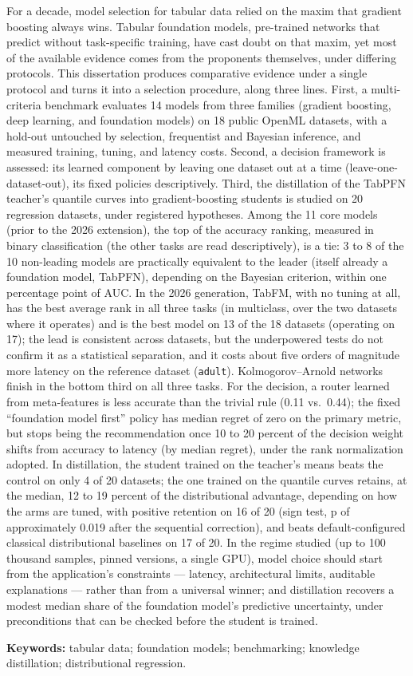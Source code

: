 \enlargethispage{2\baselineskip}%
For a decade, model selection for tabular data relied on the maxim that
gradient boosting always wins. Tabular foundation models, pre-trained
networks that predict without task-specific training, have cast doubt on
that maxim, yet most of the available evidence comes from the
proponents themselves, under differing protocols. This dissertation
produces comparative evidence under a single protocol and turns it
into a selection procedure, along three lines. First, a multi-criteria
benchmark evaluates 14 models from three families (gradient boosting,
deep learning, and foundation models) on 18 public OpenML datasets,
with a hold-out untouched by selection, frequentist and
Bayesian inference, and measured training, tuning, and latency
costs.
Second, a decision framework is assessed: its learned component by
leaving one dataset out at a
time (leave-one-dataset-out), its fixed policies descriptively. Third, the distillation of the TabPFN
teacher's quantile curves into gradient-boosting students is studied on
20 regression datasets, under registered hypotheses. Among the 11
core models (prior to the 2026 extension), the top of the accuracy ranking, measured in binary classification
(the other tasks are read descriptively), is a tie: 3 to 8 of the
10 non-leading models are practically equivalent to the leader (itself
already a foundation model, TabPFN),
depending on the Bayesian criterion, within one percentage point
of AUC. In the 2026 generation, TabFM, with no tuning at all, has the
best average rank in all three tasks (in multiclass, over the two
datasets where it operates) and is the best model on 13 of the
18 datasets (operating on 17); the lead is consistent across
datasets, but the
underpowered tests do not confirm it as a
statistical separation, and it costs about five orders of
magnitude more latency
on the reference dataset (\texttt{adult}). Kolmogorov--Arnold networks finish in the bottom
third on all three tasks. For the decision, a router learned from
meta-features is less accurate than the trivial rule (0.11 vs.\ 0.44);
the fixed ``foundation model first'' policy has median regret of zero on
the primary metric, but stops being the recommendation once 10 to 20
percent of the decision weight shifts from accuracy to latency (by
median regret), under the rank normalization adopted.
In distillation, the student trained on the teacher's means beats
the
control on only 4 of 20 datasets; the one trained on the quantile
curves retains, at the median, 12 to 19 percent of the
distributional advantage, depending on how the arms are tuned, with
positive retention on 16 of 20 (sign test, p of approximately
0.019 after the sequential correction), and beats default-configured classical
distributional baselines on 17 of 20. In the
regime studied (up to 100 thousand samples, pinned
versions, a single GPU), model choice should start from the
application's constraints --- latency, architectural limits,
auditable explanations --- rather than from a universal winner; and
distillation recovers a modest median share of the foundation
model's predictive uncertainty, under preconditions that can be
checked before the student is trained.

\vspace{0.4cm}
\noindent\textbf{Keywords:} tabular data; foundation models;
benchmarking; knowledge distillation; distributional regression.

